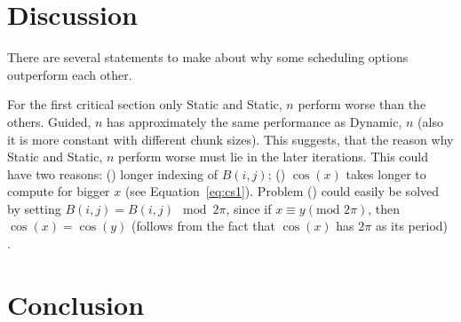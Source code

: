 \documentclass[twoside,11pt]{article}
\begin{document}

\section{Discussion}

There are several statements to make about why some
scheduling options outperform each other.

For the first critical section only Static and Static, $n$
perform worse than the others.
Guided, $n$ has approximately the same performance
as Dynamic, $n$ (also it is more constant with different
chunk sizes). This suggests, that the reason why Static and
Static, $n$ perform worse must lie in the later iterations.
This could have two reasons: () longer
indexing of $B(i, j)$; () $\cos(x)$ takes
longer to compute for bigger $x$
(see Equation~\ref{eq:cs1}).
Problem () could easily be solved by
setting $B(i, j) = B(i, j) \mod 2\pi$, since if
$x \equiv y (\text{mod }2\pi)$, then $\cos(x) = \cos(y)$
(follows from the fact that $\cos(x)$ has $2\pi$ as its
period) \citep[see e.g.][]{trig}.






\section{Conclusion}





\end{document}

